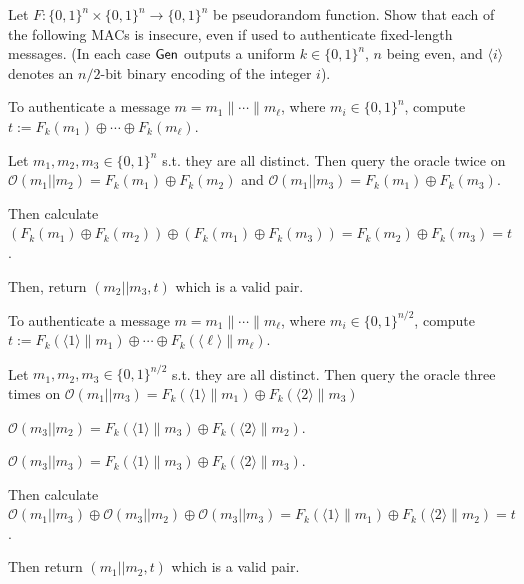 \documentclass[12pt, letterpaper]{article}
\newcommand{\skcgen}{{\sf Gen}}
\newcommand{\bit}{{\{0,1\}}}
\begin{document}
\color{\TextColor}
\pagecolor{\colormode}
\setlength{\parindent}{0pt}
\pagestyle{fancy}
\fancyhf{}

\begin{problem}{}
    Let $F\colon \bit^n \times \bit^n \rightarrow \bit^n$ be pseudorandom function.
  Show that each of the following MACs is insecure, even if used to
  authenticate fixed-length
  messages. (In each case $\skcgen$ outputs a uniform $k \in \bit^n$,
  $n$ being even, and $\langle i \rangle$ denotes an $n/2$-bit binary
  encoding of the integer $i$).
\end{problem}
\begin{subproblem}{}
    To authenticate a message $m = m_1\| \cdots \| m_\ell$, where
          $m_i \in \bit^n$, compute \\
          $t := F_k(m_1)\oplus \cdots \oplus F_k(m_\ell)$.
\end{subproblem}
\begin{problemproof}
    Let $m_1,m_2,m_3 \in \bit^n$ s.t. they are all distinct. Then query the oracle twice on
    $\mathcal{O}(m_1||m_2)=F_k(m_1) \oplus F_k(m_2)$ and $\mathcal{O}(m_1||m_3)=F_k(m_1) \oplus F_k(m_3)$.

    Then calculate $(F_k(m_1) \oplus F_k(m_2)) \oplus (F_k(m_1) \oplus F_k(m_3)) = F_k(m_2) \oplus F_k(m_3)=t$.

    Then, return $(m_2||m_3, t)$ which is a valid pair.
\end{problemproof}

\begin{subproblem}{}
    To authenticate a message $m = m_1 \| \cdots \| m_\ell$, where
          $m_i \in \bit^{n/2}$, compute \\
          $t := F_k(\langle 1 \rangle \| m_1) \oplus \cdots \oplus
            F_k(\langle \ell \rangle \| m_\ell)$.
\end{subproblem}
\begin{problemproof}
    Let $m_1,m_2,m_3 \in \bit^{n/2}$ s.t. they are all distinct. Then query the oracle three times on
    $\mathcal{O}(m_1||m_3)=F_k(\langle 1 \rangle \| m_1) \oplus F_k(\langle 2 \rangle \| m_3)$
    
    $\mathcal{O}(m_3 || m_2) = F_k(\langle 1 \rangle \| m_3) \oplus F_k(\langle 2 \rangle \| m_2)$.
    
    $\mathcal{O}(m_3 || m_3)= F_k(\langle 1 \rangle \| m_3) \oplus F_k(\langle 2 \rangle \| m_3)$.

    Then calculate $\mathcal{O}(m_1||m_3) \oplus \mathcal{O}(m_3 || m_2) \oplus \mathcal{O}(m_3 || m_3) = F_k(\langle 1 \rangle \| m_1) \oplus F_k(\langle 2 \rangle \| m_2)=t$.

    Then return $(m_1||m_2, t)$ which is a valid pair.
\end{problemproof}
\end{document}
